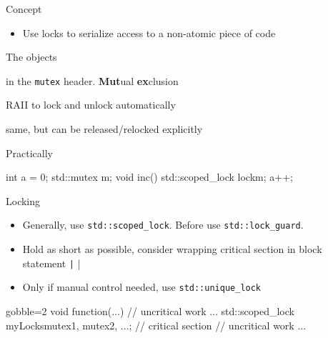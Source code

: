 \begin{frame}[fragile]
  \begin{block}{Concept}
    \begin{itemize}
    \item Use locks to serialize access to a non-atomic piece of code
    \end{itemize}
  \end{block}
  \pause
  \begin{block}{The objects}
    \begin{description}[labelwidth=1.8cm]
    \item[std::mutex] in the \texttt{mutex} header. \textbf{Mut}ual \textbf{ex}clusion
    \item[std::scoped\_lock] RAII to lock and unlock automatically
    \item[std::unique\_lock] same, but can be released/relocked explicitly
    \end{description}
  \end{block}
  \pause
  \begin{exampleblock}{Practically }
    \begin{cppcode*}{}
      int a = 0;
      std::mutex m;
      void inc() {
        std::scoped_lock lock{m};
        a++;
      }
    \end{cppcode*}
  \end{exampleblock}
\end{frame}

\begin{frame}[fragile]
  \begin{goodpractice}{Locking}
    \begin{itemize}
      \item Generally, use \texttt{std::scoped_lock}. Before  use \texttt{std::lock_guard}.
      \item Hold as short as possible, consider wrapping critical section in block statement \texttt|{ }|
      \item Only if manual control needed, use \texttt{std::unique_lock}
    \end{itemize}
  \end{goodpractice}
  \begin{exampleblock}{}
    \begin{cppcode*}{gobble=2}
      void function(...) {
        // uncritical work ...
        {
          std::scoped_lock myLocks{mutex1, mutex2, ...};
          // critical section
        }
        // uncritical work ...
      }
    \end{cppcode*}
  \end{exampleblock}
\end{frame}

